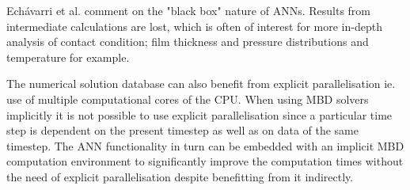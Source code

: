 Echávarri et al. \cite{EchavarriOtero2014} comment on the "black box" nature of ANNs. Results from intermediate calculations are lost, which is often of interest for more in-depth analysis of contact condition; film thickness and pressure distributions and temperature for example.  

The numerical solution database can also benefit from explicit parallelisation ie. use of multiple computational cores of the CPU. When using MBD solvers implicitly it is not possible to use explicit parallelisation since a particular time step is dependent on the present timestep as well as on data of the same timestep. The ANN functionality in turn can be embedded with an implicit MBD computation environment to significantly improve the computation times without the need of explicit parallelisation despite benefitting from it indirectly. 

